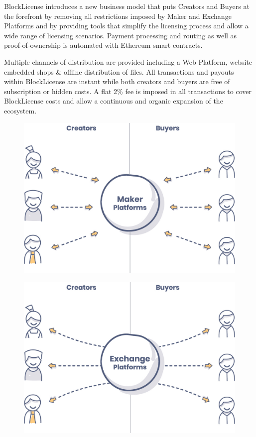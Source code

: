 BlockLicense introduces a new business model that puts Creators and Buyers at the forefront by removing all restrictions imposed by Maker and Exchange Platforms and by  providing tools that simplify the licensing process and allow a wide range of licensing scenarios. Payment processing and routing as well as proof-of-ownership is automated with Ethereum smart contracts.

Multiple channels of distribution are provided including a Web Platform, website embedded shops \& offline distribution of files. All transactions and payouts within BlockLicense are instant while both creators and buyers are free of subscription or hidden costs. A flat 2\% fee is imposed in all transactions to cover BlockLicense costs and allow a continuous and organic expansion of the ecosystem.

\begin{figure}[bp]
\centering
\begin{minipage}{.45\textwidth}
  \centering
  \includegraphics[width=.8\linewidth]{./figures/fig9.jpg}
  \label{fig:maker}
\end{minipage}
\begin{minipage}{.45\textwidth}
  \centering
  \includegraphics[width=.8\linewidth]{./figures/fig10.jpg}
  \label{fig:exchange}
\end{minipage}%
\end{figure}
